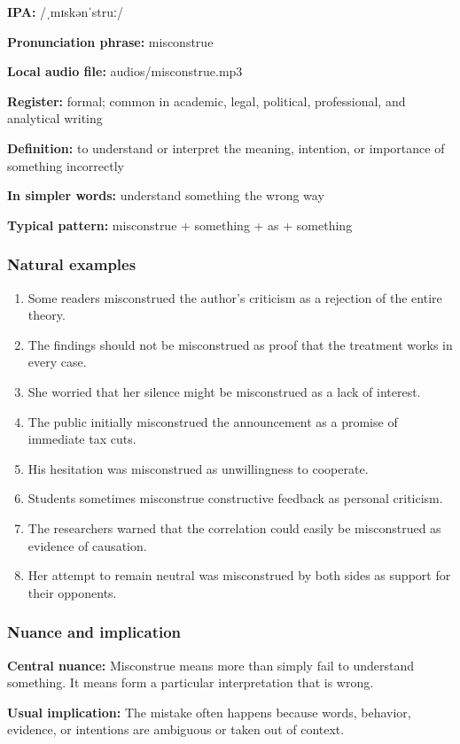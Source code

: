 \documentclass[11pt]{article}
\begin{document}
\textbf{IPA:} /ˌmɪskənˈstruː/

\textbf{Pronunciation phrase:} misconstrue

\textbf{Local audio file:} audios/misconstrue.mp3

\textbf{Register:} formal; common in academic, legal, political, professional, and analytical writing

\textbf{Definition:} to understand or interpret the meaning, intention, or importance of something incorrectly

\textbf{In simpler words:} understand something the wrong way

\textbf{Typical pattern:} misconstrue + something + as + something

\subsubsection{Natural examples}
\begin{enumerate}
  \item Some readers misconstrued the author's criticism as a rejection of the entire theory.
  \item The findings should not be misconstrued as proof that the treatment works in every case.
  \item She worried that her silence might be misconstrued as a lack of interest.
  \item The public initially misconstrued the announcement as a promise of immediate tax cuts.
  \item His hesitation was misconstrued as unwillingness to cooperate.
  \item Students sometimes misconstrue constructive feedback as personal criticism.
  \item The researchers warned that the correlation could easily be misconstrued as evidence of causation.
  \item Her attempt to remain neutral was misconstrued by both sides as support for their opponents.
\end{enumerate}

\subsubsection{Nuance and implication}
\textbf{Central nuance:} Misconstrue means more than simply fail to understand something. It means form a particular interpretation that is wrong.

\textbf{Usual implication:} The mistake often happens because words, behavior, evidence, or intentions are ambiguous or taken out of context.
\end{document}
